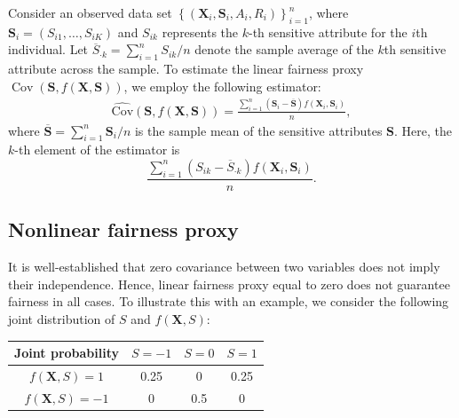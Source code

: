 \documentclass[12pt]{article}
\theoremstyle{plain}
\theoremstyle{definition}
\theoremstyle{remark}
\begin{document}
Consider an observed data set $\left\{\left(\boldsymbol{X}_i, \boldsymbol{S}_i, A_i, R_i\right)\right\}_{i=1}^n$, where $\boldsymbol{S}_i=(S_{i1},  \ldots, S_{iK})$ and $S_{ik}$ represents the $k$-th sensitive attribute for the $i$th individual. Let $\overline{S}_{\cdot k}=\sum_{i=1}^n{S}_{ik}/n$ denote the sample average of the $k$th sensitive attribute across the sample.
To estimate the linear fairness proxy $\operatorname{Cov}\left(\boldsymbol{S}, f(\boldsymbol{X}, \boldsymbol{S})\right)$, we employ the following estimator:
\begin{equation}
\label{e6}
\begin{aligned}
\operatorname{\widehat{Cov}}\left(\boldsymbol{S}, f(\boldsymbol{X}, \boldsymbol{S})\right)
= \frac{\sum_{i=1}^n(\boldsymbol{S}_{i}-\boldsymbol{\overline{S}})f(\boldsymbol{X}_i,\boldsymbol{S}_i)}{n},
\nonumber
\end{aligned}
\end{equation}
where $\boldsymbol{\overline{S}}=\sum_{i=1}^n\boldsymbol{S}_{i}/n$ is the sample mean of the sensitive attributes $\boldsymbol{S}$. %
Here, the $k$-th element of the estimator is
$$
\frac{\sum_{i=1}^n({S}_{ik}-\overline{S}_{\cdot k})f(\boldsymbol{X}_i,\boldsymbol{S}_i)}{n}.
$$

\subsection{Nonlinear fairness  proxy}
It is well-established that zero covariance between two variables does not imply their independence. Hence, linear fairness proxy equal to zero does not guarantee fairness in all cases. To illustrate this with an example, we consider the following joint distribution of $S$ and $f(\boldsymbol{X}, {S})$:

\vspace{0.2in}
  \begin{center}
\begin{tabular}{cccc}
  \toprule
    Joint probability & $S=-1 $ & $S=0$& $S=1$\\
      \midrule
     $ f(\boldsymbol{X}, {S})=1$ & 0.25  & 0 &0.25  \\
  \midrule
   $ f(\boldsymbol{X}, {S})=-1$  & 0 &0.5  & 0 \\
  \bottomrule
\end{tabular}
\end{center}
\vspace{0.2in}
\end{document}
